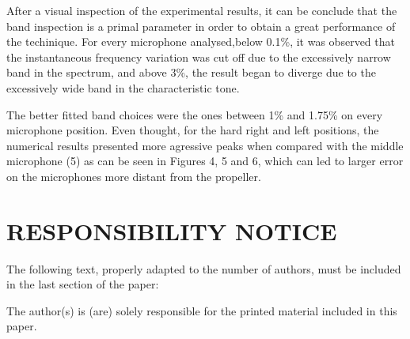 \documentclass[10pt,fleqn,a4paper,twoside]{article}
\begin{document}
After a visual inspection of the experimental results, it can be conclude that the band inspection is a primal parameter in order to obtain a great performance of the techinique. For every microphone analysed,below 0.1\%, it was observed that the instantaneous frequency variation was cut off due to the excessively narrow band in the spectrum, and above 3\%, the result began to diverge due to the excessively wide band in the characteristic tone. 

The better fitted band choices were the ones between 1\% and 1.75\% on every microphone position. Even thought, for the hard right and left positions, the numerical results presented more agressive peaks when compared with the middle microphone (5) as can be seen in Figures 4, 5 and 6, which can led to larger error on the microphones more distant from the propeller. 




\renewcommand{\refname}{}


\section{RESPONSIBILITY NOTICE}

The following text, properly adapted to the number of authors, must be included in the last section of the paper:

The author(s) is (are) solely responsible for the printed material included in this paper.
\end{document}
